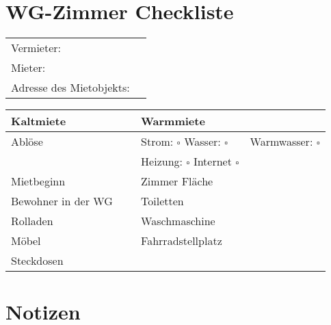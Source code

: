 \documentclass[a4paper]{scrartcl}
\begin{document}
\section*{WG-Zimmer Checkliste}


\begin{tabular*}{\textwidth}{ll@{}}
Vermieter:               &  \\ %
Mieter:                  &  \\ %
Adresse des Mietobjekts: &  \\ %
\end{tabular*}

\begin{tabular*}{\textwidth}{|l|p{4cm}|l|p{4cm}|}
\hline
Kaltmiete          & ~ & Warmmiete                                    & ~ \\\hline
Ablöse             & ~ & Strom: $\square$ Wasser: $\square$   & Warmwasser: $\square$ \\\hline
                   & ~ & Heizung: $\square$ Internet $\square$ & ~ \\\hline
Mietbeginn         & ~ & Zimmer Fläche                                & ~ \\\hline
Bewohner in der WG & ~ & Toiletten                                    & ~ \\\hline
Rolladen           & ~ & Waschmaschine                                & ~ \\\hline
Möbel              & ~ & Fahrradstellplatz                            & ~ \\\hline
Steckdosen         & ~ & ~                                            & ~ \\\hline
\end{tabular*}


\section*{Notizen}
\end{document}

